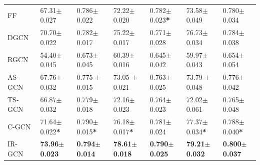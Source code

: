 \begin{table}[!h]
\begin{threeparttable}[!h]
\begin{subtable}{\textwidth}
{\begin{tabular}{l|l l| l l | l l}
     {FF~\cite{JendersKN16}} & 67.31$\pm$0.027 & 0.786$\pm$0.022 & 72.22$\pm$0.020 & 0.782$\pm$0.023\textbf{*} & 73.58$\pm$0.049 & 0.780$\pm$0.034 \\
     {DGCN~\cite{DualGCN}} & 70.70$\pm$0.022 & 0.782$\pm$0.017 & 75.22$\pm$0.017 & 0.771$\pm$0.028 & 76.73$\pm$0.034 &0.784$\pm$0.038 \\
     {RGCN~\cite{relationalGCN}} & 54.40$\pm$0.045 & 0.673$\pm$0.045 & 60.39$\pm$0.016 & 0.645$\pm$0.042 & 59.97$\pm$0.043 & 0.654$\pm$0.054 \\
     \cmidrule(lr){1-1}\cmidrule(lr){2-7}
     {AS-GCN} & 67.76$\pm$0.032 &0.775 $\pm$0.015 & 73.05 $\pm$0.021 & 0.763$\pm$0.025 &73.79 $\pm$0.048 & 0.776$\pm$0.042 \\
     {TS-GCN} & 66.87$\pm$0.032 & 0.779$\pm$0.018 & 72.16$\pm$0.023 & 0.764$\pm$0.023 & 72.02$\pm$0.061 & 0.765$\pm$0.048 \\
     {C-GCN} & 71.64$\pm$0.022\textbf{*} & 0.790$\pm$0.015\textbf{*}& 76.18$\pm$0.017\textbf{*}& 0.781$\pm$0.024 & 77.37$\pm$0.034\textbf{*}& 0.788$\pm$0.040\textbf{*} \\
     {IR-GCN} & \bfseries 73.96$\pm$\bfseries0.023 & \bfseries0.794$\pm$\bfseries0.014 & \bfseries 78.61$\pm$\bfseries0.018 & \bfseries0.790$\pm$\bfseries0.025 & \bfseries79.21$\pm$\bfseries0.032 & \bfseries0.800$\pm$\bfseries0.037 \\
     \bottomrule
   \end{tabular}
   }
   \end{subtable}\vspace{8mm}
   \begin{subtable}{\textwidth}
\end{subtable}
\end{threeparttable}
\end{table}
